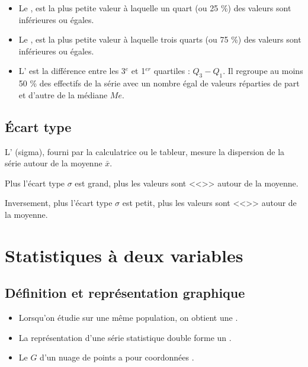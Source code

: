 \documentclass[12pt,a4paper]{article}
\begin{document}
\begin{mydef}
	\begin{itemize}
		\item Le , est la plus petite valeur à laquelle un quart (ou 25 \%) des valeurs sont inférieures ou égales.
		\item Le , est la plus petite valeur à laquelle trois quarts (ou 75 \%) des valeurs sont inférieures ou égales.
		\item L' est la différence entre les 3$^e$ et 1$^{er}$ quartiles : $Q_3 - Q_1$. Il regroupe au moins 50 \% des effectifs de la série avec un nombre égal de valeurs réparties de part et d'autre de la médiane $Me$.
	\end{itemize}
	
\end{mydef}	

\subsection{\'Ecart type}

\begin{mydef}
	L' (sigma), fourni par la calculatrice ou le tableur, mesure la dispersion de la série autour de la moyenne $\bar{x}$. 
	
	Plus l'écart type $\sigma$ est grand, plus les valeurs sont <<>> autour de la moyenne. 
	
	Inversement, plus l'écart type $\sigma$ est petit, plus les valeurs sont <<>> autour de la moyenne.
\end{mydef}	


\section{Statistiques à deux variables}

\subsection{Définition et représentation graphique}

\begin{mybilan}
	\begin{itemize}
		\item Lorsqu'on étudie  sur une même population, on obtient une .
		
		\item La représentation d'une série statistique double forme un .
		
		\item Le  $G$ d'un  nuage de points a pour coordonnées .
	\end{itemize}
	

\end{mybilan}
\end{document}
